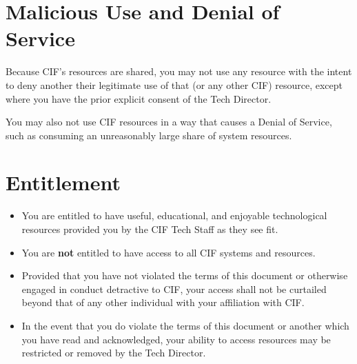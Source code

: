 \documentclass[12pt]{article}
\begin{document}
\section{Malicious Use and Denial of Service} %

Because CIF's resources are shared, you may not use any resource with the intent to deny another their legitimate use of that (or any other CIF) resource, except where you have the prior explicit consent of the Tech Director.

You may also not use CIF resources in a way that causes a Denial of Service, such as consuming an unreasonably large share of system resources.


\section{Entitlement} %

\begin{itemize}
	\item You are entitled to have useful, educational, and enjoyable technological resources provided you by the CIF Tech Staff as they see fit.
	\item You are \textbf{not} entitled to have access to all CIF systems and resources.
	\item Provided that you have not violated the terms of this document or otherwise engaged in conduct detractive to CIF, your access shall not be curtailed beyond that of any other individual with your affiliation with CIF.
	\item In the event that you do violate the terms of this document or another which you have read and acknowledged, your ability to access resources may be restricted or removed by the Tech Director.
\end{itemize}

\end{document}
